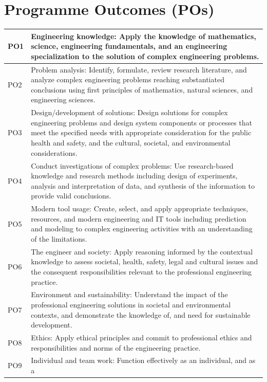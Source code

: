\documentclass[12pt,a4paper]{report}
\begin{document}
\section*{\hfil\normalsize{\textbf{Programme Outcomes (POs)}}\hfil}
\onehalfspacing

\begin{longtable}{| p{} | p{} |}
\hline
PO1 & Engineering knowledge: Apply the knowledge of mathematics, science,
engineering fundamentals, and an engineering specialization to the solution of
complex engineering problems.
\\
\hline
PO2 & Problem analysis: Identify, formulate, review research literature, and analyze
complex engineering problems reaching substantiated conclusions using first
principles of mathematics, natural sciences, and engineering sciences.
 \\
\hline
PO3 & Design/development of solutions: Design solutions for complex engineering
problems and design system components or processes that meet the specified
needs with appropriate consideration for the public health and safety, and the
cultural, societal, and environmental considerations.
 \\
\hline
PO4 & Conduct investigations of complex problems: Use research-based knowledge
and research methods including design of experiments, analysis and
interpretation of data, and synthesis of the information to provide valid
conclusions.
 \\
\hline
PO5 & Modern tool usage: Create, select, and apply appropriate techniques, resources,
and modern engineering and IT tools including prediction and modeling to
complex engineering activities with an understanding of the limitations.
 \\
\hline
PO6 & The engineer and society: Apply reasoning informed by the contextual
knowledge to assess societal, health, safety, legal and cultural issues and the
consequent responsibilities relevant to the professional engineering practice.
 \\
\hline
PO7 & Environment and sustainability: Understand the impact of the professional
engineering solutions in societal and environmental contexts, and demonstrate
the knowledge of, and need for sustainable development.
 \\
\hline
PO8 & Ethics: Apply ethical principles and commit to professional ethics and
responsibilities and norms of the engineering practice.
 \\
\hline
PO9 & Individual and team work: Function effectively as an individual, and as a

\end{longtable}
\end{document}
